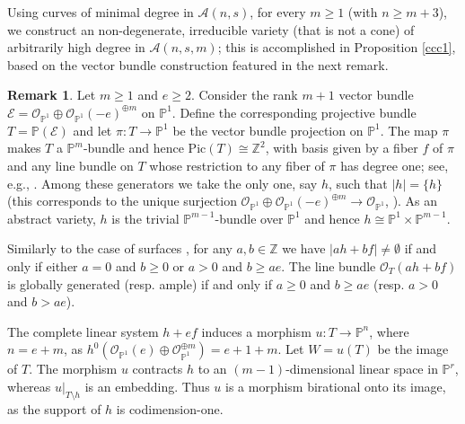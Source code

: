 \documentclass[a4, 11pt]{amsart}
\theoremstyle{plain}
\theoremstyle{definition}
\newtheorem{remark}[theorem]{Remark}
\newcommand{\enm}[1]{\ensuremath{#1}}          %
\newcommand{\cal}[1]{\mathcal{#1}}
\newcommand{\ZZ}{\enm{\mathbb{Z}}}
\newcommand{\PP}{\enm{\mathbb{P}}}
\newcommand{\Aa}{\enm{\cal{A}}}
\newcommand{\Ee}{\enm{\cal{E}}}
\newcommand{\Oo}{\enm{\cal{O}}}
\renewcommand{\to}[1][]{\xrightarrow{\ #1\ }}
\begin{document}
 
Using curves of minimal degree in $\Aa(n,s)$, for every $m\ge 1$ (with $n\geq m+3$), we construct an non-degenerate, irreducible variety (that is not a cone) of arbitrarily high degree in $\Aa(n,s,m)$; this is accomplished in Proposition \ref{ccc1}, based on the vector bundle construction featured in the next remark. 

\begin{remark}\label{ccc0}
Let $m \ge 1$ and $e\ge 2$. Consider the rank $m+1$ vector bundle $\Ee = \Oo _{\PP^1}\oplus \Oo
_{\PP^1}(-e)^{\oplus m}$ on $\PP^1$. Define the corresponding projective bundle $T = \PP(\Ee)$ and let $\pi: T\to \PP^1$ be the vector bundle projection on $\PP^1$. The map $\pi$ makes $T$ a $\PP^{m}$-bundle and hence $\mathrm{Pic}(T) \cong \ZZ^2$, with basis given by a fiber $f$ of $\pi$ and any line bundle
on $T$ whose restriction to any fiber of $\pi$ has degree one; see, e.g., \cite[Ex. II.7.9]{h}. Among these
generators we take the only one, say $h$, such that
$|h| =\{h\}$ (this corresponds to the unique surjection $\Oo _{\PP^1}\oplus \Oo
_{\PP^1}(-e)^{\oplus m} \to \Oo _{\PP^1}$, \cite[Ch. II]{h}). As an abstract variety,
$h$ is the trivial $\PP^{m-1}$-bundle over $\PP^1$ and hence $h\cong \PP^1\times \PP^{m-1}$. 

Similarly to the case of surfaces \cite[Ch. V]{h}, for any $a, b\in\ZZ$ we have $|ah+bf|\ne\emptyset$ if and only if either $a=0$ and $b\ge 0$ or $a>0$ and $b\ge ae$. The line bundle $\Oo_T(ah+bf)$ is globally generated (resp. ample) if and only if $a\ge 0$ and $b\ge ae$ (resp. $a>0$ and $b>ae$). 

The complete linear system $h+ef$ induces a morphism $u: T\to \PP^n$, where $n =  e+m$, as $h^0(\Oo _{\PP^1}(e)\oplus \Oo _{\PP^1}^{\oplus m}) 
=e+1+m$. Let $W= u(T)$ be the image of $T$. The morphism $u$ contracts $h$ to an $(m-1)$-dimensional linear space in $\PP^r$, whereas $u|_{T\setminus h}$ is an
embedding. Thus $u$ is a morphism birational onto its image, as the support of $h$ is codimension-one. \\


\end{remark}
\end{document}
